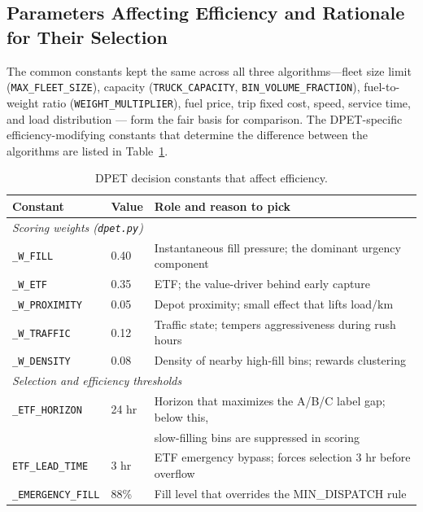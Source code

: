 \documentclass[12pt,a4paper]{report}
\begin{document}
\begin{itemize}[leftmargin=*]
\section{Parameters Affecting Efficiency and Rationale for Their Selection}
\label{sec:parameters}

\indent The common constants kept the same across all three algorithms—fleet size limit (\texttt{MAX\_FLEET\_SIZE}), capacity (\texttt{TRUCK\_CAPACITY}, \texttt{BIN\_VOLUME\_FRACTION}), fuel-to-weight ratio (\texttt{WEIGHT\_MULTIPLIER}), fuel price, trip fixed cost, speed, service time, and load distribution --- form the fair basis for comparison. The DPET-specific efficiency-modifying constants that determine the difference between the algorithms are listed in Table~\ref{tab:dpet_constants}.

\begin{table}[H]
\centering
\caption{DPET decision constants that affect efficiency.}
\label{tab:dpet_constants}
\small
\begin{tabular}{lll}
\toprule
\textbf{Constant} & \textbf{Value} & \textbf{Role and reason to pick} \\
\midrule
\multicolumn{3}{l}{\textit{Scoring weights (\texttt{dpet.py})}} \\
\texttt{\_W\_FILL}            & 0.40 & Instantaneous fill pressure; the dominant urgency component \\
\texttt{\_W\_ETF}             & 0.35 & ETF; the value-driver behind early capture \\
\texttt{\_W\_PROXIMITY}       & 0.05 & Depot proximity; small effect that lifts load/km \\
\texttt{\_W\_TRAFFIC}         & 0.12 & Traffic state; tempers aggressiveness during rush hours \\
\texttt{\_W\_DENSITY}         & 0.08 & Density of nearby high-fill bins; rewards clustering \\
\midrule
\multicolumn{3}{l}{\textit{Selection and efficiency thresholds}} \\
\texttt{\_ETF\_HORIZON}       & 24 hr & Horizon that maximizes the A/B/C label gap; below this, \\
                              &       & slow-filling bins are suppressed in scoring \\
\texttt{ETF\_LEAD\_TIME}      & 3 hr  & ETF emergency bypass; forces selection 3 hr before overflow \\
\texttt{\_EMERGENCY\_FILL}    & 88\%  & Fill level that overrides the MIN\_DISPATCH rule \\

\end{tabular}
\end{table}
\end{itemize}
\end{document}

